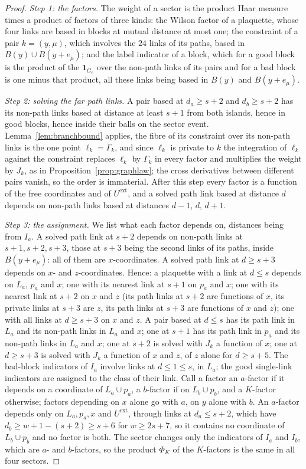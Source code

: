 \documentclass[11pt]{amsart}
\theoremstyle{definition}
\theoremstyle{remark}
\numberwithin{equation}{section}
\begin{document}
\begin{proof}
\emph{Step 1: the factors.} The weight of a sector is the product Haar
measure times a product of factors of three kinds: the Wilson factor of a
plaquette, whose four links are based in blocks at mutual distance at most
one; the constraint of a pair $k=(y,\mu)$, which involves the $24$ links
of its paths, based in $B(y)\cup B(y+e_\mu)$; and the label indicator of a
block, which for a good block is the product of the $\mathbf 1_{G_e}$ over
the non-path links of its pairs and for a bad block is one minus that
product, all these links being based in $B(y)$ and $B(y+e_\mu)$.

\emph{Step 2: solving the far path links.} A pair based at $d_a\ge s+2$
and $d_b\ge s+2$ has its non-path links based at distance at least $s+1$
from both islands, hence in good blocks, hence inside their balls on the
sector event. Lemma~\ref{lem:branchbound} applies, the fibre of its
constraint over its non-path links is the one point $\ell_k=\Gamma_k$,
and since $\ell_k$ is private to $k$ the integration of $\ell_k$ against
the constraint replaces $\ell_k$ by $\Gamma_k$ in every factor and
multiplies the weight by $J_k$, as in Proposition~\ref{prop:graphlaw};
the cross derivatives between different pairs vanish, so the order is
immaterial. After this step every factor is a function of the free
coordinates and of $U^{\mathrm{ext}}$, and a solved path link based at
distance $d$ depends on non-path links based at distances $d-1$, $d$,
$d+1$.

\emph{Step 3: the assignment.} We list what each factor depends on,
distances being from $I_a$. A solved path link at $s+2$ depends on
non-path links at $s+1,s+2,s+3$, those at $s+3$ being the second links of
its paths, inside $B(y+e_\mu)$: all of them are $x$-coordinates. A solved
path link at $d\ge s+3$ depends on $x$- and $z$-coordinates. Hence: a
plaquette with a link at $d\le s$ depends on $L_a$, $p_a$ and $x$; one
with its nearest link at $s+1$ on $p_a$ and $x$; one with its nearest
link at $s+2$ on $x$ and $z$ (its path links at $s+2$ are functions of
$x$, its private links at $s+3$ are $z$, its path links at $s+3$ are
functions of $x$ and $z$); one with all links at $d\ge s+3$ on $x$ and
$z$. A pair based at $d\le s$ has its path link in $L_a$ and its non-path
links in $L_a$ and $x$; one at $s+1$ has its path link in $p_a$ and its
non-path links in $L_a$ and $x$; one at $s+2$ is solved with $J_k$ a
function of $x$; one at $d\ge s+3$ is solved with $J_k$ a function of $x$
and $z$, of $z$ alone for $d\ge s+5$. The bad-block indicators of $I_a$
involve links at $d\le1\le s$, in $L_a$; the good single-link indicators
are assigned to the class of their link. Call a factor an $a$-factor if
it depends on a coordinate of $L_a\cup p_a$, a $b$-factor if on
$L_b\cup p_b$, and a $K$-factor otherwise; factors depending on $x$ alone
go with $a$, on $y$ alone with $b$. An $a$-factor depends only on
$L_a,p_a,x$ and $U^{\mathrm{ext}}$, through links at $d_a\le s+2$, which
have $d_b\ge w+1-(s+2)\ge s+6$ for $w\ge2s+7$, so it contains no
coordinate of $L_b\cup p_b$ and no factor is both. The sector changes
only the indicators of $I_a$ and $I_b$, which are $a$- and $b$-factors,
so the product $\Phi_K$ of the $K$-factors is the same in all four
sectors.


\end{proof}
\end{document}
